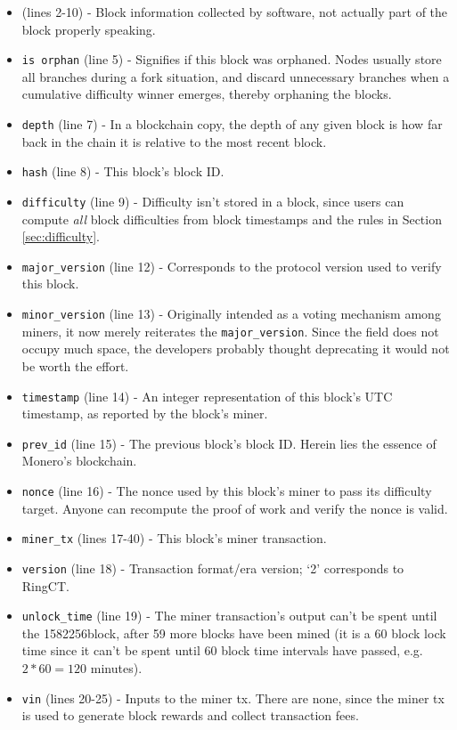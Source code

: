 \begin{appendices}
\begin{itemize}
	\item (lines 2-10) - Block information collected by software, not actually part of the block properly speaking.
    \item {\tt is orphan} (line 5) - Signifies if this block was orphaned. Nodes usually store all branches during a fork situation, and discard unnecessary branches when a cumulative difficulty winner emerges, thereby orphaning the blocks.
    \item {\tt depth} (line 7) - In a blockchain copy, the depth of any given block is how far back in the chain it is relative to the most recent block.
    \item {\tt hash} (line 8) - This block's block ID.
    \item {\tt difficulty} (line 9) - Difficulty isn't stored in a block, since users can compute {\em all} block difficulties from block timestamps and the rules in Section \ref{sec:difficulty}.
    \item {\tt major\_version} (line 12) - Corresponds to the protocol version used to verify this block.
    \item {\tt minor\_version} (line 13) - Originally intended as a voting mechanism among miners, it now merely reiterates the {\tt major\_version}. Since the field does not occupy much space, the developers probably thought deprecating it would not be worth the effort.
    \item {\tt timestamp} (line 14) - An integer representation of this block's UTC timestamp, as reported by the block's miner.
    \item {\tt prev\_id} (line 15) - The previous block's block ID. Herein lies the essence of Monero's blockchain.
    \item {\tt nonce} (line 16) - The nonce used by this block's miner to pass its difficulty target. Anyone can recompute the proof of work and verify the nonce is valid.
    \item {\tt miner\_tx} (lines 17-40) - This block's miner transaction.
    \item {\tt version} (line 18) - Transaction format/era version; `2' corresponds to RingCT.
    \item {\tt unlock\_time} (line 19) - The miner transaction's output can't be spent until the 1582256\nth block, after 59 more blocks have been mined (it is a 60 block lock time since it can't be spent until 60 block time intervals have passed, e.g. $2*60 = 120$ minutes).
    \item {\tt vin} (lines 20-25) - Inputs to the miner tx. There are none, since the miner tx is used to generate block rewards and collect transaction fees.

\end{itemize}
\end{appendices}
